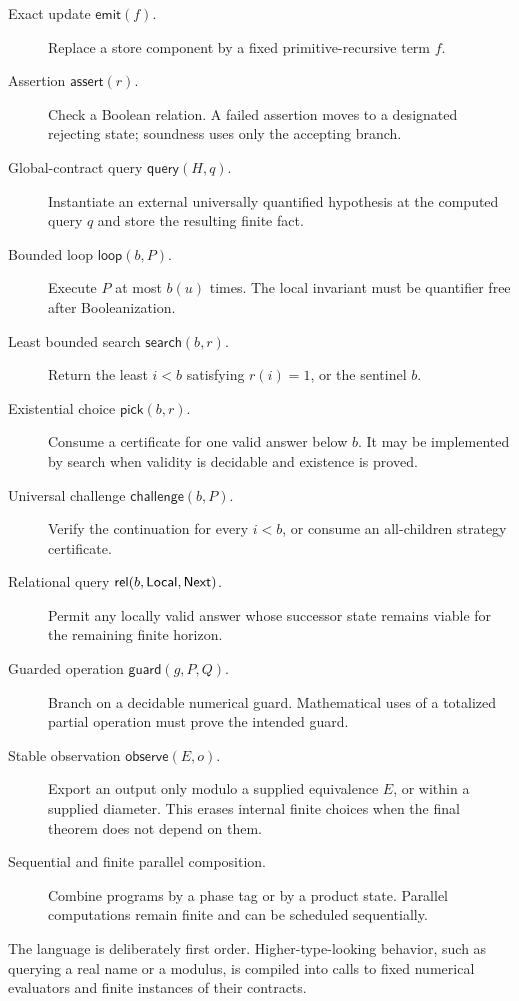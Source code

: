 \begin{description}
\item[Exact update \(\mathsf{emit}(f)\).] Replace a store component by a fixed primitive-recursive term \(f\).
\item[Assertion \(\mathsf{assert}(r)\).] Check a Boolean relation.  A failed assertion moves to a designated rejecting state; soundness uses only the accepting branch.
\item[Global-contract query \(\mathsf{query}(H,q)\).] Instantiate an external universally quantified hypothesis at the computed query \(q\) and store the resulting finite fact.
\item[Bounded loop \(\mathsf{loop}(b,P)\).] Execute \(P\) at most \(b(u)\) times.  The local invariant must be quantifier free after Booleanization.
\item[Least bounded search \(\mathsf{search}(b,r)\).] Return the least \(i<b\) satisfying \(r(i)=1\), or the sentinel \(b\).
\item[Existential choice \(\mathsf{pick}(b,r)\).] Consume a certificate for one valid answer below \(b\).  It may be implemented by search when validity is decidable and existence is proved.
\item[Universal challenge \(\mathsf{challenge}(b,P)\).] Verify the continuation for every \(i<b\), or consume an all-children strategy certificate.
\item[Relational query \(\mathsf{rel}(b,\mathsf{Local},\mathsf{Next})\).] Permit any locally valid answer whose successor state remains viable for the remaining finite horizon.
\item[Guarded operation \(\mathsf{guard}(g,P,Q)\).] Branch on a decidable numerical guard.  Mathematical uses of a totalized partial operation must prove the intended guard.
\item[Stable observation \(\mathsf{observe}(E,o)\).] Export an output only modulo a supplied equivalence \(E\), or within a supplied diameter.  This erases internal finite choices when the final theorem does not depend on them.
\item[Sequential and finite parallel composition.] Combine programs by a phase tag or by a product state.  Parallel computations remain finite and can be scheduled sequentially.
\end{description}

The language is deliberately first order.  Higher-type-looking behavior, such as querying a real name or a modulus, is compiled into calls to fixed numerical evaluators and finite instances of their contracts.

